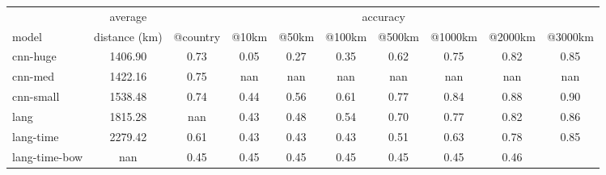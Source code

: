
\begin{tabular}{l|c|cccccccc}
& average &\multicolumn{8}{c}{accuracy} \\
model & distance (km) & @country & @10km & @50km & @100km & @500km & @1000km & @2000km & @3000km \\
\hline
\hline
cnn-huge & 1406.90 & 0.73 & 0.05 & 0.27 & 0.35 & 0.62 & 0.75 & 0.82 & 0.85 \\
cnn-med & 1422.16 & 0.75 & nan & nan & nan & nan & nan & nan & nan \\
cnn-small & 1538.48 & 0.74 & 0.44 & 0.56 & 0.61 & 0.77 & 0.84 & 0.88 & 0.90 \\
 lang & 1815.28 & nan & 0.43 & 0.48 & 0.54 & 0.70 & 0.77 & 0.82 & 0.86 \\
 lang-time & 2279.42 & 0.61 & 0.43 & 0.43 & 0.43 & 0.51 & 0.63 & 0.78 & 0.85 \\
 lang-time-bow & nan & 0.45 & 0.45 & 0.45 & 0.45 & 0.45 & 0.45 & 0.46 \\
 \end{tabular}
